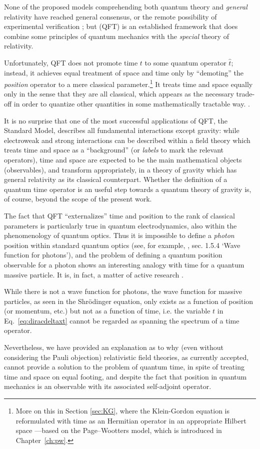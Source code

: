 None of the proposed models comprehending both quantum theory and \emph{general} relativity
have reached general consensus,
or the remote possibility of experimental verification \parencite{QGravIntro};
but  (QFT) is an established framework that does combine
some principles
of quantum mechanics with the \emph{special} theory of relativity.

Unfortunately, QFT does not promote time $t$ to some quantum operator $\hat{t}$;
instead, it achieves equal treatment of space and time only by
``demoting'' the \emph{position} operator to a mere classical parameter.\footnote{
  More on this in Section \ref{sec:KG}, where the Klein-Gordon equation is reformulated
  with time as an Hermitian operator in an appropriate Hilbert space
  ---based on the Page--Wootters model, which is introduced in Chapter~\ref{ch:pw}.
}
It treats time and space equally only in the sense that they are all classical,
which appears as the necessary trade-off in order to quantize other quantities
in some mathematically tractable way. \parencite[\s I.1]{SrednickiQFT}.

It is no surprise that one of the most successful applications
of QFT, the Standard Model, describes all fundamental interactions except gravity:
while electroweak and strong interactions can be described within a field theory
which treats time and space as a ``background'' (or \emph{labels} to mark the relevant operators),
time and space are expected to be the main mathematical objects (observables),
and transform appropriately,
in a theory of gravity
which has general relativity as its classical counterpart.
Whether the definition of a quantum time operator is an useful step towards
a quantum theory of gravity is, of course, beyond the scope of the present work.

The fact that QFT ``externalizes'' time and position to the rank of classical parameters
is particularly true in quantum electrodynamics, also within the
phenomenology of quantum optics.
Thus it is impossible to define a \emph{photon} position
within standard quantum optics (see, for example, \cite{ScullyZubairy}, sec. 1.5.4 `Wave function for photons'),
and the problem of defining a quantum position observable for a photon
shows an interesting analogy with time for a quantum massive particle.
It is, in fact, a matter of active research \parencite{HawtonPhotonPosition, Hawton2019}.

While there is not a wave function for photons, the wave function for massive particles,
as seen in the Shr\"{o}dinger equation, only exists as a function of position (or momentum, etc.)
but not as a function of time,
i.e. the variable $t$ in Eq.~\eqref{eq:diracdeltaxt}
cannot be regarded as spanning the spectrum of a time operator.

Nevertheless, we have provided an explanation as to why (even without considering the Pauli objection)
relativistic field theories, as currently accepted, cannot provide a solution
to the problem of quantum time, in spite of treating time and space on equal footing,
and despite the fact that position in quantum mechanics is an observable
with its associated self-adjoint operator.
